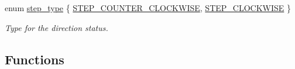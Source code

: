 \begin{DoxyCompactItemize}
enum \hyperlink{group__biba__drv_ga3af682b92aa259509aea217f6dc64356}{step\-\_\-type} \{ \hyperlink{group__biba__drv_gga3af682b92aa259509aea217f6dc64356a05e804aea3cc6dd53f5d5a836d0365c9}{S\-T\-E\-P\-\_\-\-C\-O\-U\-N\-T\-E\-R\-\_\-\-C\-L\-O\-C\-K\-W\-I\-S\-E}, 
\hyperlink{group__biba__drv_gga3af682b92aa259509aea217f6dc64356aafe6025725d6001f0b0a973f1e719cc4}{S\-T\-E\-P\-\_\-\-C\-L\-O\-C\-K\-W\-I\-S\-E}
 \}
\begin{DoxyCompactList}\small\item\em Type for the direction status. \end{DoxyCompactList}\end{DoxyCompactItemize}
\subsection*{Functions}
